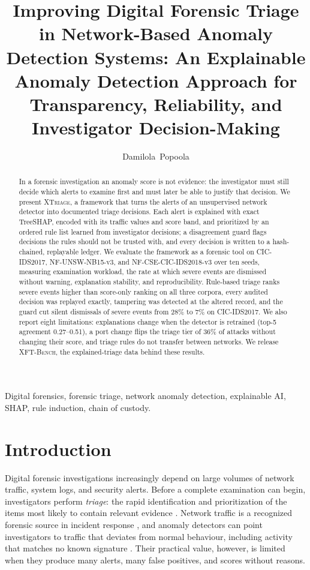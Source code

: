 \documentclass[journal]{IEEEtran}
\title{Improving Digital Forensic Triage in Network-Based Anomaly Detection Systems: An Explainable Anomaly Detection Approach for Transparency, Reliability, and Investigator Decision-Making}
\author{Damilola~Popoola}
\begin{document}
\maketitle

\begin{abstract}
In a forensic investigation an anomaly score is not evidence: the investigator must still decide which alerts to examine first and must later be able to justify that decision. We present \textsc{XTriage}, a framework that turns the alerts of an unsupervised network detector into documented triage decisions. Each alert is explained with exact TreeSHAP, encoded with its traffic values and score band, and prioritized by an ordered rule list learned from investigator decisions; a disagreement guard flags decisions the rules should not be trusted with, and every decision is written to a hash-chained, replayable ledger. We evaluate the framework as a forensic tool on CIC-IDS2017, NF-UNSW-NB15-v3, and NF-CSE-CIC-IDS2018-v3 over ten seeds, measuring examination workload, the rate at which severe events are dismissed without warning, explanation stability, and reproducibility. Rule-based triage ranks severe events higher than score-only ranking on all three corpora, every audited decision was replayed exactly, tampering was detected at the altered record, and the guard cut silent dismissals of severe events from 28\% to 7\% on CIC-IDS2017. We also report eight limitations: explanations change when the detector is retrained (top-5 agreement 0.27--0.51), a port change flips the triage tier of 36\% of attacks without changing their score, and triage rules do not transfer between networks. We release \textsc{XFT-Bench}, the explained-triage data behind these results.
\end{abstract}

\begin{IEEEkeywords}
Digital forensics, forensic triage, network anomaly detection, explainable AI, SHAP, rule induction, chain of custody.
\end{IEEEkeywords}

\section{Introduction}
\label{sec:intro}
Digital forensic investigations increasingly depend on large volumes of network traffic, system logs, and security alerts. Before a complete examination can begin, investigators perform \emph{triage}: the rapid identification and prioritization of the items most likely to contain relevant evidence \cite{rogers}. Network traffic is a recognized forensic source in incident response \cite{nist}, and anomaly detectors can point investigators to traffic that deviates from normal behaviour, including activity that matches no known signature \cite{iforest}. Their practical value, however, is limited when they produce many alerts, many false positives, and scores without reasons.
\end{document}
